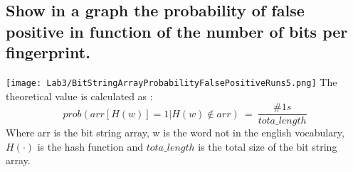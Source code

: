 \documentclass{report}
\begin{document}
			\subsection{Show in a graph the probability of false positive in function of the number of bits per fingerprint.}
			\texttt{[image: Lab3/BitStringArrayProbabilityFalsePositiveRuns5.png]}
			The theoretical value is calculated as :
			\begin{equation}\label{eq:4}
				prob(arr[H(w)]=1|H(w) \not\in arr) \: = \: \frac{\#1s}{tota\_length} 
			\end{equation}
			Where arr is the bit string array, w is the word not in the english vocabulary, $H(\cdot)$ is the hash function and $tota\_length$ is the total size of the bit string array.
			
			
			
\end{document}
